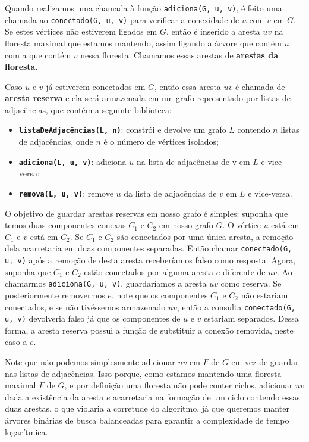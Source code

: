 Quando realizamos uma chamada à função \texttt{adiciona(G, u, v)}, é feito uma chamada ao \texttt{conectado(G, u, v)} para verificar a conexidade de $u$ com $v$ em $G$. Se estes vértices não estiverem ligados em $G$, então é inserido a aresta $uv$ na floresta maximal que estamos mantendo, assim ligando a árvore que contém $u$ com a que contém $v$ nessa floresta. Chamamos essas arestas de \textbf{arestas da floresta}.

Caso $u$ e $v$ já estiverem conectados em $G$, então essa aresta $uv$ é chamada de \textbf{aresta reserva} e ela será armazenada em um grafo representado por listas de adjacências, que contém a seguinte biblioteca:

\begin{itemize}
    \item \texttt{\textbf{listaDeAdjacências(L, n)}}: constrói e devolve um grafo $L$ contendo $n$ listas de adjacências, onde $n$ é o número de vértices isolados;
    \item \texttt{\textbf{adiciona(L, u, v)}}: adiciona $u$ na lista de adjacências de v em $L$ e vice-versa;
    \item \texttt{\textbf{remova(L, u, v)}}: remove $u$ da lista de adjacências de $v$ em $L$ e vice-versa.
\end{itemize} 

O objetivo de guardar arestas reservas em nosso grafo é simples: suponha que temos duas componentes conexas $C_1$ e $C_2$ em nosso grafo $G$. O vértice $u$ está em $C_1$ e $v$ está em $C_2$. Se $C_1$ e $C_2$ são conectados por uma única aresta, a remoção dela acarretaria em duas componentes separadas. Então chamar \texttt{conectado(G, u, v)} após a remoção de desta aresta receberíamos falso como resposta. Agora, suponha que $C_1$ e $C_2$ estão conectados por alguma aresta $e$ diferente de $uv$. Ao chamarmos \texttt{adiciona(G, u, v)}, guardaríamos a aresta $uv$ como reserva. Se posteriormente removermos $e$, note que os componentes $C_1$ e $C_2$ não estariam conectados, e se não tivéssemos armazenado $uv$, então a consulta \texttt{conectado(G, u, v)} devolveria falso já que os componentes de $u$ e $v$ estariam separados. Dessa forma, a aresta reserva possui a função de substituir a conexão removida, neste caso a $e$.

Note que não podemos simplesmente adicionar $uv$ em $F$ de $G$ em vez de guardar nas listas de adjacências. Isso porque, como estamos mantendo uma floresta maximal $F$ de $G$, e por definição uma floresta não pode conter ciclos, adicionar $uv$ dada a existência da aresta $e$ acarretaria na formação de um ciclo contendo essas duas arestas, o que violaria a corretude do algoritmo, já que queremos manter árvores binárias de busca balanceadas para garantir a complexidade de tempo logarítmica.

